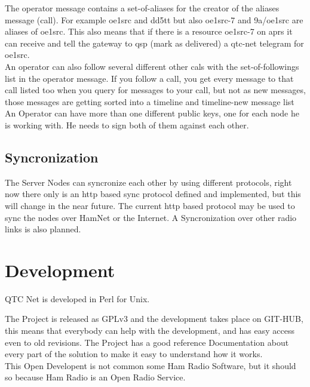 The operator message contains a set-of-aliases for the creator of the aliases 
message (call). For example oe1src and dd5tt but also oe1src-7 and 9a/oe1src 
are aliases of oe1src. This also means that if there is a resource oe1src-7 
on aprs it can receive and tell the gateway to qsp (mark as delivered) a qtc-net 
telegram for oe1src. \\

An operator can also follow several different other cals with the set-of-followings
list in the operator message.  If you follow a call, you get every message to that call 
listed  too when you query for messages to your call, but not as new messages, those 
messages are getting sorted into a timeline and timeline-new message list\\

An Operator can have more than one different public keys, one for each 
node he is working with. He needs to sign both of them against each other. \\

\subsection{Syncronization}

The Server Nodes can syncronize each other by using different protocols, right
now there only is an http based sync protocol defined and implemented, but this
will change in the near future. The current http based protocol may be used to 
sync the nodes over HamNet or the Internet. A Syncronization over other radio 
links is also planned.  \\

\section{Development}

QTC Net is developed in Perl for Unix.

The Project is released as GPLv3 and the development takes place on GIT-HUB,
this means that everybody can help with the development, and has easy access
even to old revisions. The Project has a good reference Documentation about
every part of the solution to make it easy to understand how it works. \\

This Open Developent is not common some Ham Radio Software, but it should so 
because Ham Radio is an Open Radio Service. \\

